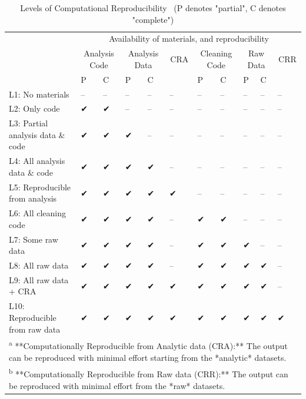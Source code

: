 \documentclass[
]{book}
\begin{document}
\begin{table}

\caption{\label{tab:levels-of-computational-reproducibility}Levels of Computational Reproducibility \
 (P denotes "partial", C denotes "complete")}
\centering
\begin{tabular}[t]{l|l|l|l|l|l|l|l|l|l|l}
\hline
\multicolumn{1}{c|}{ } & \multicolumn{10}{c}{Availability of materials, and reproducibility} \\
\cline{2-11}
\multicolumn{1}{c|}{ } & \multicolumn{2}{c|}{Analysis Code} & \multicolumn{2}{c|}{Analysis Data} & \multicolumn{1}{c|}{CRA} & \multicolumn{2}{c|}{Cleaning Code} & \multicolumn{2}{c|}{Raw Data} & \multicolumn{1}{c}{CRR} \\
\cline{2-3} \cline{4-5} \cline{6-6} \cline{7-8} \cline{9-10} \cline{11-11}
  & P & C & P & C &   & P & C & P & C &  \\
\hline
L1: No materials & -- & -- & -- & -- & -- & -- & -- & -- & -- & --\\
\hline
L2: Only code & ✔ & ✔ & -- & -- & -- & -- & -- & -- & -- & --\\
\hline
L3: Partial analysis data \& code & ✔ & ✔ & ✔ & -- & -- & -- & -- & -- & -- & --\\
\hline
L4: All analysis data \& code & ✔ & ✔ & ✔ & ✔ & -- & -- & -- & -- & -- & --\\
\hline
L5: Reproducible from analysis & ✔ & ✔ & ✔ & ✔ & ✔ & -- & -- & -- & -- & --\\
\hline
L6: All cleaning code & ✔ & ✔ & ✔ & ✔ & -- & ✔ & ✔ & -- & -- & --\\
\hline
L7: Some raw data & ✔ & ✔ & ✔ & ✔ & -- & ✔ & ✔ & ✔ & -- & --\\
\hline
L8: All raw data & ✔ & ✔ & ✔ & ✔ & -- & ✔ & ✔ & ✔ & ✔ & --\\
\hline
L9: All raw data + CRA & ✔ & ✔ & ✔ & ✔ & ✔ & ✔ & ✔ & ✔ & ✔ & --\\
\hline
L10: Reproducible from raw data & ✔ & ✔ & ✔ & ✔ & ✔ & ✔ & ✔ & ✔ & ✔ & ✔\\
\hline
\multicolumn{11}{l}{\textsuperscript{a} **Computationally Reproducible from Analytic data (CRA):** The output can be reproduced with minimal effort starting from the *analytic* datasets.}\\
\multicolumn{11}{l}{\textsuperscript{b} **Computationally Reproducible from Raw data (CRR):** The output can be reproduced with minimal effort from the *raw* datasets.}\\
\end{tabular}
\end{table}
\end{document}
